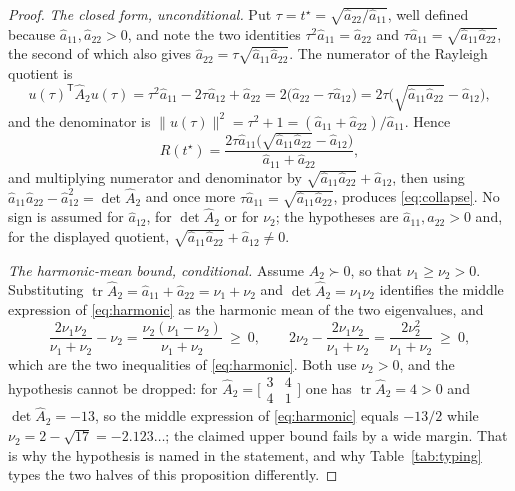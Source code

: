 \documentclass[11pt,a4paper]{article}
\theoremstyle{plain}
\theoremstyle{definition}
\newcommand{\T}{\mathsf{T}}
\newcommand{\PD}{\succ 0}
\newcommand{\Ah}{\widehat{A}}
\newcommand{\ah}{\widehat{a}}
\DeclareMathOperator{\tr}{tr}
\begin{document}
\begin{proof}
\emph{The closed form, unconditional.} Put
$\tau=t^{\star}=\sqrt{\ah_{22}/\ah_{11}}$, well defined because
$\ah_{11},\ah_{22}>0$, and note the two identities
$\tau^{2}\ah_{11}=\ah_{22}$ and $\tau\ah_{11}=\sqrt{\ah_{11}\ah_{22}}$, the
second of which also gives $\ah_{22}=\tau\sqrt{\ah_{11}\ah_{22}}$. The
numerator of the Rayleigh quotient is
\[
  u(\tau)^{\T}\Ah_2u(\tau)=\tau^{2}\ah_{11}-2\tau\ah_{12}+\ah_{22}
  =2\bigl(\ah_{22}-\tau\ah_{12}\bigr)
  =2\tau\bigl(\sqrt{\ah_{11}\ah_{22}}-\ah_{12}\bigr),
\]
and the denominator is
$\lVert u(\tau)\rVert^{2}=\tau^{2}+1=(\ah_{11}+\ah_{22})/\ah_{11}$. Hence
\[
  R(t^{\star})
  =\frac{2\tau\ah_{11}\bigl(\sqrt{\ah_{11}\ah_{22}}-\ah_{12}\bigr)}
        {\ah_{11}+\ah_{22}},
\]
and multiplying numerator and denominator by
$\sqrt{\ah_{11}\ah_{22}}+\ah_{12}$, then using
$\ah_{11}\ah_{22}-\ah_{12}^{2}=\det\Ah_2$ and once more
$\tau\ah_{11}=\sqrt{\ah_{11}\ah_{22}}$, produces \eqref{eq:collapse}. No sign
is assumed for $\ah_{12}$, for $\det\Ah_2$ or for $\nu_2$; the hypotheses are
$\ah_{11},\ah_{22}>0$ and, for the displayed quotient,
$\sqrt{\ah_{11}\ah_{22}}+\ah_{12}\ne0$.

\emph{The harmonic-mean bound, conditional.} Assume $\Ah_2\PD$, so that
$\nu_1\ge\nu_2>0$. Substituting $\tr\Ah_2=\ah_{11}+\ah_{22}=\nu_1+\nu_2$ and
$\det\Ah_2=\nu_1\nu_2$ identifies the middle expression of
\eqref{eq:harmonic} as the harmonic mean of the two eigenvalues, and
\[
  \frac{2\nu_1\nu_2}{\nu_1+\nu_2}-\nu_2
  =\frac{\nu_2(\nu_1-\nu_2)}{\nu_1+\nu_2}\ \ge\ 0,
  \qquad
  2\nu_2-\frac{2\nu_1\nu_2}{\nu_1+\nu_2}
  =\frac{2\nu_2^{2}}{\nu_1+\nu_2}\ \ge\ 0,
\]
which are the two inequalities of \eqref{eq:harmonic}. Both use $\nu_2>0$, and
the hypothesis cannot be dropped: for
$\Ah_2=\bigl[\begin{smallmatrix}3&4\\4&1\end{smallmatrix}\bigr]$ one has
$\tr\Ah_2=4>0$ and $\det\Ah_2=-13$, so the middle expression of
\eqref{eq:harmonic} equals $-13/2$ while
$\nu_2=2-\sqrt{17}=-2.123\ldots$; the claimed upper bound fails by a wide
margin. That is why the hypothesis is named in the statement, and why
Table~\ref{tab:typing} types the two halves of this proposition differently.
\end{proof}
\end{document}
